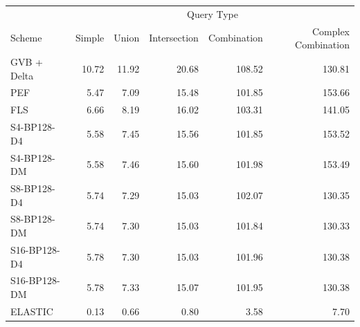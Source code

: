 \begin{tabular}{lrrrrr}
\toprule
 & \multicolumn{5}{c}{Query Type} \\
Scheme & Simple & Union & Intersection & Combination & Complex Combination \\
\midrule
GVB + Delta & 10.72 & 11.92 & 20.68 & 108.52 & 130.81 \\
PEF & 5.47 & 7.09 & 15.48 & 101.85 & 153.66 \\
FLS & 6.66 & 8.19 & 16.02 & 103.31 & 141.05 \\
S4-BP128-D4 & 5.58 & 7.45 & 15.56 & 101.85 & 153.52 \\
S4-BP128-DM & 5.58 & 7.46 & 15.60 & 101.98 & 153.49 \\
S8-BP128-D4 & 5.74 & 7.29 & 15.03 & 102.07 & 130.35 \\
S8-BP128-DM & 5.74 & 7.30 & 15.03 & 101.84 & 130.33 \\
S16-BP128-D4 & 5.78 & 7.30 & 15.03 & 101.96 & 130.38 \\
S16-BP128-DM & 5.78 & 7.33 & 15.07 & 101.95 & 130.38 \\
ELASTIC & 0.13 & 0.66 & 0.80 & 3.58 & 7.70 \\
\bottomrule
\end{tabular}
